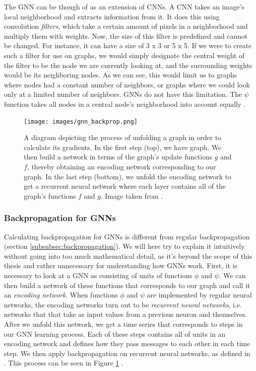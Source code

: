 \documentclass[times, utf8, diplomski, english]{fer_eng}
\begin{document}
The GNN can be though of as an extension of CNNs. A CNN takes an image's local neighborhood and extracts information from it. It does this using convolution \textit{filters}, which take a certain amount of pixels in a neighborhood and multiply them with weights. Now, the size of this filter is predefined and cannot be changed. For instance, it can have a size of 3 x 3 or 5 x 5. If we were to create such a filter for use on graphs, we would simply designate the central weight of the filter to be the node we are currently looking at, and the surrounding weights would be its neighboring nodes. As we can see, this would limit us to graphs where nodes had a constant number of neighbors, or graphs where we could look only at a limited number of neighbors. GNNs do not have this limitation. The $\psi$ function takes all nodes in a central node's neighborhood into account equally \cite{GRL} \cite{bronstein2021geometric}.

\begin{figure}
	\centering
	\texttt{[image: images/gnn\_backprop.png]}
	\caption[GNN backpropagation]{A diagram depicting the process of unfolding a graph in order to calculate its gradients. In the first step (top), we have graph. We then build a network in terms of the graph's update functions $g$ and $f$, thereby obtaining an encoding network corresponding to our graph. In the last step (bottom), we unfold the encoding network to get a recurrent neural network where each layer contains all of the graph's functions $f$ and $g$. Image taken from \cite{GNN}.}
	\label{fig:gnn backprop}
\end{figure}

\subsubsection{Backpropagation for GNNs}

Calculating backpropagation for GNNs is different from regular backpropagation (section \ref{subsubsec:backpropagation}). We will here try to explain it intuitively without going into too much mathematical detail, as it's beyond the scope of this thesis and rather unnecessary for understanding how GNNs work. First, it is necessary to look at a GNN as consisting of units of functions $\phi$ and $\psi$. We can then build a network of these functions that corresponds to our graph and call it an \textit{encoding network}. When functions $\phi$ and $\psi$ are implemented by regular neural networks, the encoding networks turn out to be \textit{recurrent neural networks}, i.e. networks that that take as input values from a previous neuron and themselves. After we unfold this network, we get a time series that corresponds to steps in our GNN learning process. Each of these steps contains all of units in an encoding network and defines how they pass messages to each other in each time step. We then apply backpropagation on recurrent neural networks, as defined in \cite{rnn_backprop}. This process can be seen in Figure \ref{fig:gnn backprop} \cite{GNN}.
\end{document}
